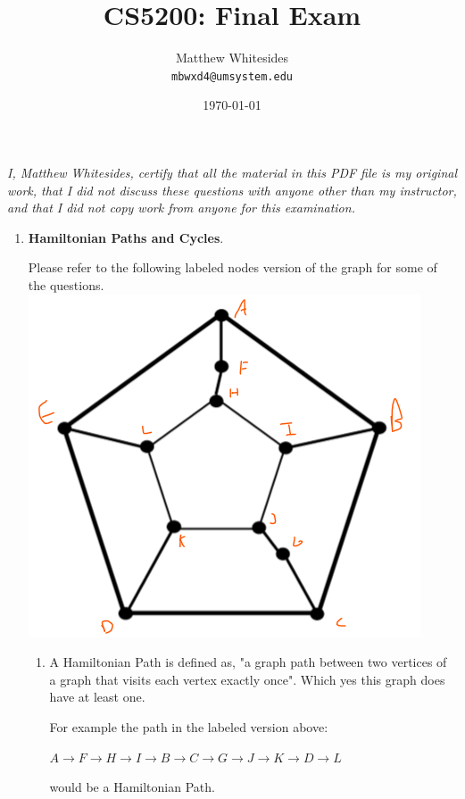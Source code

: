 \documentclass{article}
\title{CS5200: Final Exam} %
\author{Matthew Whitesides\\ \texttt{mbwxd4@umsystem.edu}} %
\date{\today} %
\begin{document}
  \maketitle %

  \textit{I, Matthew Whitesides, certify that all the material in this PDF file is my original work, that I did not discuss these questions with anyone other than my instructor, and that I did not copy work from anyone for this examination.}
 
  \begin{enumerate}
    \item \textbf{Hamiltonian Paths and Cycles}.
    
    Please refer to the following labeled nodes version of the graph for some of the questions.\\
    \includegraphics[scale=0.75]{1_Graph.png}

    \begin{enumerate}
        \item A Hamiltonian Path is defined as, "a graph path between two vertices of a graph that visits each vertex exactly once". Which yes this graph does have at least one. 
        
        For example the path in the labeled version above: 
        
        ${A \rightarrow F \rightarrow H \rightarrow I \rightarrow B \rightarrow C \rightarrow G \rightarrow J \rightarrow K \rightarrow D \rightarrow L}$ 
        
        would be a Hamiltonian Path.


\end{enumerate}
\end{enumerate}
\end{document}
